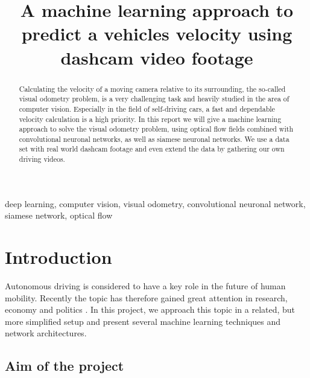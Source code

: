 \documentclass[conference]{IEEEtran}
\begin{document}
\title{A machine learning approach to predict a vehicles velocity using dashcam video footage}

\author{
\and
{}
}

\maketitle

\begin{abstract}
Calculating the velocity of a moving camera relative to its surrounding, the so-called visual odometry 
problem, is a very challenging task and heavily studied in the area of computer vision. Especially
in the field of self-driving cars, a fast and dependable velocity calculation is a high priority.
In this report we will give a machine learning approach to solve the visual odometry problem, using 
optical flow fields combined with convolutional neuronal networks, as well as siamese neuronal networks.
We use a data set with real world dashcam footage and even extend the data by gathering our own
driving videos.
\end{abstract}

\begin{IEEEkeywords}
deep learning, computer vision, visual odometry, convolutional neuronal network, siamese network,
optical flow
\end{IEEEkeywords}

\section{Introduction}

Autonomous driving is considered to have a key role in the future of human mobility. Recently the topic has therefore gained great attention in research, economy and politics \cite{Maurer2016}. In this project, we approach this topic in a related, but more simplified setup and present several machine learning techniques and network architectures.

\subsection{Aim of the project}
\label{subsec:AimAndMeasure}
\end{document}
